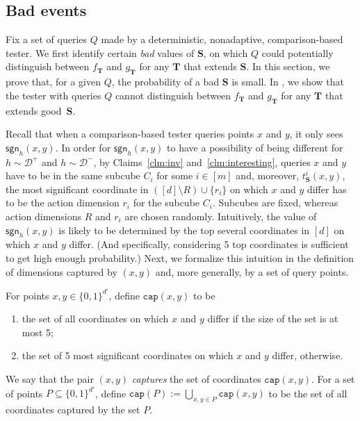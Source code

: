 \documentclass{toc}
\newcommand{\bS}{\ensuremath{\mathbf{S}}}
\newcommand{\bT}{\ensuremath{\mathbf{T}}}
\newcommand{\hypercube}{\ensuremath{\{0,1\}^\dd}}
\newcommand{\Yes}{\ensuremath{\mathcal{D}^+}}
\newcommand{\No}{\ensuremath{\mathcal{D}^-}}
\newcommand{\coord}[2]{t^{#1}_{#2}}
\newcommand{\capt}{\mathtt{cap}}
\newcommand{\dd}{\ensuremath{{d'}}}
\newcommand{\sgn}{\mathsf{sgn}}
\newcommand{\Sec}[1]{\expref{Section}{sec:#1}}
\begin{document}
\subsection{Bad events}\label{sec:bad}
Fix a set of queries $Q$ made by a deterministic, nonadaptive, comparison-based tester.
We first identify certain \emph{bad} values of $\bS$,
%
on which $Q$ could potentially distinguish between $f_{\bT}$ and $g_{\bT}$ for any $\bT$ that extends $\bS$.
In this section, we prove that, for a given $Q$, the probability
of a bad $\bS$ is small.
%
In \Sec{indisting}, we show that the tester with queries $Q$ cannot distinguish between $f_{\bT}$ and $g_{\bT}$ for any $\bT$ that extends
%
good~$\bS$.
%

Recall that when a comparison-based tester queries points $x$ and $y$, it only sees $\sgn_h(x,y)$.  In order for $\sgn_h(x,y)$ to have a possibility of being different for $h\sim\Yes$ and $h\sim\No$, by Claims~\ref{clm:inv} and~\ref{clm:interesting}, queries $x$ and $y$ have to be in the same subcube $C_i$ for some $i\in [m]$ and, moreover, $\coord{i}{\bS}(x,y)$, the most significant coordinate in $([d] \setminus R) \cup \{r_i\}$ on which $x$ and $y$ differ has to be the action dimension $r_i$ for the subcube $C_i$. Subcubes are fixed, whereas action dimensions $R$ and $r_i$ are chosen randomly. Intuitively, the value of $\sgn_h(x,y)$ is likely to be determined by the top several coordinates in $[d]$ on which $x$ and $y$ differ. (And specifically, considering 5 top coordinates is sufficient to get high enough probability.) Next, we formalize this intuition in the definition of dimensions captured by $(x,y)$ and, more generally, by a set of query points.

\begin{definition}\label{def:cap}
For points $x,y \in \hypercube$, define $\capt(x,y)$ to be
	\begin{enumerate}
	\item the set of all coordinates on which $x$ and $y$ differ if the size of the set is at most 5;
	\item the set of 5 most significant coordinates %
	on which $x$ and $y$ differ, otherwise.
	\end{enumerate}
We say that the pair $(x,y)$ \emph{captures} the set of coordinates $\capt(x,y)$.
For a set of points
$P\subseteq \{0,1\}^{\dd}$, define $\capt(P) := \bigcup_{x,y \in P} \capt(x,y)$
to be the set of all coordinates captured by the set $P$.
\end{definition}
\end{document}
